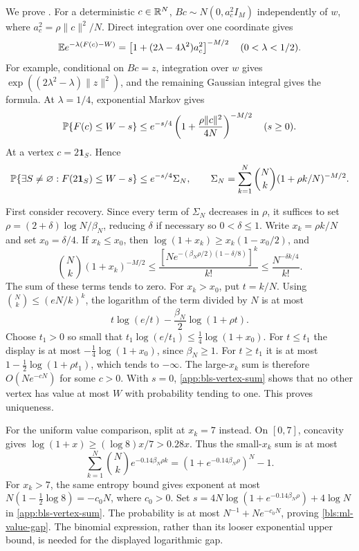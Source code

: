 We prove .  For a deterministic $c\in\mathbb{R}^N$,
$Bc\sim N(0,a_c^2I_M)$ independently of $w$, where
$a_c^2=\rho\|c\|^2/N$.  Direct integration over one coordinate gives
\[
 \mathbb{E} e^{-\lambda(F(c)-W)}
 =\left[1+(2\lambda-4\lambda^2)a_c^2\right]^{-M/2}
 \quad(0<\lambda<1/2).
\]
For example, conditional on $Bc=z$, integration over $w$ gives
$\exp((2\lambda^2-\lambda)\|z\|^2)$, and the remaining Gaussian
integral gives the formula.  At $\lambda=1/4$, exponential Markov gives
\begin{equation}
 \mathbb{P}\{F(c)\le W-s\}
 \le e^{-s/4}\left(1+\frac{\rho\|c\|^2}{4N}\right)^{-M/2}
 \quad(s\ge0).
 \label{app:bls-direction-chernoff}
\end{equation}
At a vertex $c=2\mathbf1_S$.  Hence
\begin{equation}
 \mathbb{P}\{\exists S\ne\varnothing:F(2\mathbf1_S)\le W-s\}
 \le e^{-s/4}\Sigma_N,\qquad
 \Sigma_N=\sum_{k=1}^N\binom Nk(1+\rho k/N)^{-M/2}.
 \label{app:bls-vertex-sum}
\end{equation}

First consider recovery.  Since every term of $\Sigma_N$ decreases in
$\rho$, it suffices to set
$\rho=(2+\delta)\log N/\beta_N$, reducing $\delta$ if necessary so
$0<\delta\le1$.  Write $x_k=\rho k/N$ and set $x_0=\delta/4$.
If $x_k\le x_0$, then
$\log(1+x_k)\ge x_k(1-x_0/2)$, and
\[
 \binom Nk(1+x_k)^{-M/2}
 \le\frac{[N e^{-(\beta_N\rho/2)(1-\delta/8)}]^k}{k!}
 \le\frac{N^{-\delta k/4}}{k!}.
\]
The sum of these terms tends to zero.  For $x_k>x_0$, put $t=k/N$.
Using $\binom Nk\le(eN/k)^k$, the logarithm of the term divided by $N$
is at most
\[
 t\log(e/t)-\frac{\beta_N}2\log(1+\rho t).
\]
Choose $t_1>0$ so small that
$t_1\log(e/t_1)\le\tfrac14\log(1+x_0)$.
For $t\le t_1$ the display is at most
$-\tfrac14\log(1+x_0)$, since $\beta_N\ge1$.
For $t\ge t_1$ it is at most
$1-\tfrac12\log(1+\rho t_1)$, which tends to $-\infty$.
The large-$x_k$ sum is therefore $O(Ne^{-cN})$ for some $c>0$.
With $s=0$, \eqref{app:bls-vertex-sum} shows that no other vertex has
value at most $W$ with probability tending to one.  This proves uniqueness.

For the uniform value comparison, split at $x_k=7$ instead.  On $[0,7]$,
concavity gives $\log(1+x)\ge(\log8)x/7>0.28x$.  Thus the small-$x_k$
sum is at most
\[
 \sum_{k=1}^N\binom Nk e^{-0.14\beta_N\rho k}
 =(1+e^{-0.14\beta_N\rho})^N-1.
\]
For $x_k>7$, the same entropy bound gives exponent at most
$N(1-\tfrac12\log8)=-c_0N$, where $c_0>0$.  Set
$s=4N\log(1+e^{-0.14\beta_N\rho})+4\log N$ in
\eqref{app:bls-vertex-sum}.  The probability is at most
$N^{-1}+Ne^{-c_0N}$, proving \eqref{bls:ml-value-gap}.
The binomial expression, rather than its looser exponential upper bound,
is needed for the displayed logarithmic gap.

